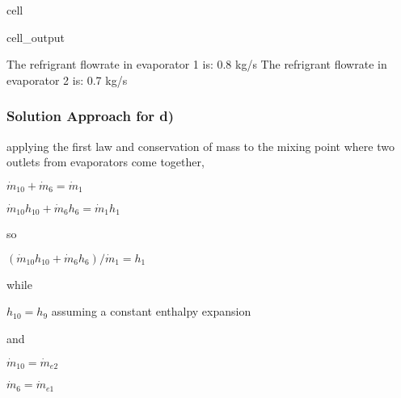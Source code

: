 \documentclass[letterpaper,10pt,english]{jupyterBook}
\begin{document}
\begin{sphinxuseclass}{cell}
\begin{sphinxVerbatimOutput}
\begin{sphinxuseclass}{cell_output}
\begin{sphinxVerbatim}[commandchars=\\\{\}]
The refrigrant flow\PYGZhy{}rate in evaporator 1 is: 0.8 kg/s
The refrigrant flow\PYGZhy{}rate in evaporator 2 is: 0.7 kg/s
\end{sphinxVerbatim}

\end{sphinxuseclass}\end{sphinxVerbatimOutput}

\end{sphinxuseclass}

\subsubsection{Solution Approach for d)}
\label{\detokenize{notebooks/Chapter5/CH5-Q8:solution-approach-for-d}}
\sphinxAtStartPar
applying the first law and conservation of mass to the mixing point where two outlets from evaporators come together,

\sphinxAtStartPar
\(\dot m_{10}+\dot m_6=\dot m_1\)

\sphinxAtStartPar
\(\dot m_{10}h_{10}+\dot m_6h_6=\dot m_1h_1\)

\sphinxAtStartPar
so

\sphinxAtStartPar
\((\dot m_{10}h_{10}+\dot m_6h_6)/\dot m_1=h_1\)

\sphinxAtStartPar
while

\sphinxAtStartPar
\(h_{10}=h_9\) assuming a constant enthalpy expansion

\sphinxAtStartPar
and

\sphinxAtStartPar
\(\dot m_{10}=\dot m_{e2}\)

\sphinxAtStartPar
\(\dot m_6=\dot m_{e1}\)
\end{document}
